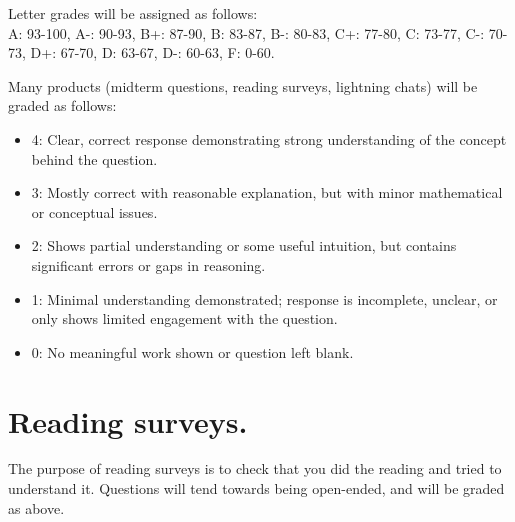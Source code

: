 \documentclass[letterpaper]{inzane_syllabus} %
\begin{document}
Letter grades will be assigned as follows: \\
A: 93-100, A-: 90-93, B+: 87-90, B: 83-87, B-: 80-83, C+: 77-80, C: 73-77, C-: 70-73, D+: 67-70, D: 63-67, D-: 60-63, F: 0-60.

Many products (midterm questions, reading surveys, lightning chats) will be graded as follows:
\begin{itemize}
\item 4:  Clear, correct response demonstrating strong understanding of the concept behind the question.
\item 3: Mostly correct with reasonable explanation, but with minor mathematical or conceptual issues. 
\item 2: Shows partial understanding or some useful intuition, but contains significant errors or gaps in reasoning.
\item 1: Minimal understanding demonstrated; response is incomplete, unclear, or only shows limited engagement with the question.
\item 0: No meaningful work shown or question left blank.
\end{itemize}

\section{Reading surveys.} The purpose of reading surveys is to check that you did the reading and tried to understand it.  Questions will tend towards being open-ended, and will be graded as above.




\end{document}
